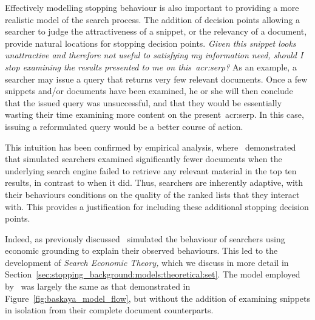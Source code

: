 Effectively modelling stopping behaviour is also important to providing a more realistic model of the search process. The addition of decision points allowing a searcher to judge the attractiveness of a snippet, or the relevancy of a document, provide natural locations for stopping decision points. \emph{Given this snippet looks unattractive and therefore not useful to satisfying my information need, should I stop examining the results presented to me on this~\gls{acr:serp}?} As an example, a searcher may issue a query that returns very few relevant documents. Once a few snippets and/or documents have been examined, he or she will then conclude that the issued query was unsuccessful, and that they would be essentially wasting their time examining more content on the present~\gls{acr:serp}. In this case, issuing a reformulated query would be a better course of action.

This intuition has been confirmed by empirical analysis, where~\cite{azzopardi2011economics} demonstrated that simulated searchers examined significantly fewer documents when the underlying search engine failed to retrieve any relevant material in the top ten results, in contrast to when it did. Thus, searchers are inherently adaptive, with their behaviours conditions on the quality of the ranked lists that they interact with. This provides a justification for including these additional stopping decision points.

Indeed, as previously discussed~\cite{azzopardi2011economics} simulated the behaviour of searchers using economic grounding to explain their observed behaviours. This led to the development of \emph{Search Economic Theory,} which we discuss in more detail in Section~\ref{sec:stopping_background:models:theoretical:set}. The model employed by~\cite{azzopardi2011economics} was largely the same as that demonstrated in Figure~\ref{fig:baskaya_model_flow}, but without the addition of examining snippets in isolation from their complete document counterparts. 


